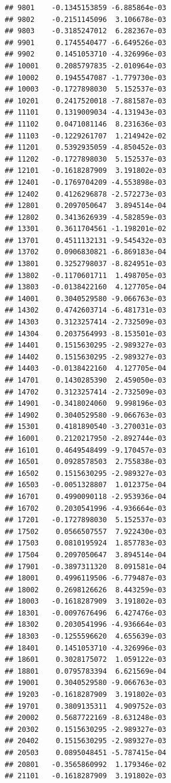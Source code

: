 \documentclass[ignorenonframetext,]{beamer}
\begin{document}
\begin{frame}[fragile]
\begin{verbatim}
## 9801    -0.1345153859 -6.885864e-03
## 9802    -0.2151145096  3.106678e-03
## 9803    -0.3185247012  6.282367e-03
## 9901     0.1745540477 -6.649526e-03
## 9902     0.1451053710 -4.326996e-03
## 10001    0.2085797835 -2.010964e-03
## 10002    0.1945547087 -1.779730e-03
## 10003   -0.1727898030  5.152537e-03
## 10201    0.2417520018 -7.881587e-03
## 11101    0.1319009034 -4.131943e-03
## 11102    0.0471081146  8.231636e-03
## 11103   -0.1229261707  1.214942e-02
## 11201    0.5392935059 -4.850452e-03
## 11202   -0.1727898030  5.152537e-03
## 12101   -0.1618287909  3.191802e-03
## 12401   -0.1769704209 -4.553898e-03
## 12402    0.4126296878 -2.572273e-03
## 12801    0.2097050647  3.894514e-04
## 12802    0.3413626939 -4.582859e-03
## 13301    0.3611704561 -1.198201e-02
## 13701    0.4511132131 -9.545432e-03
## 13702    0.0906830821 -6.869183e-04
## 13801    0.3252798037 -8.824951e-03
## 13802   -0.1170601711  1.498705e-03
## 13803   -0.0138422160  4.127705e-04
## 14001    0.3040529580 -9.066763e-03
## 14302    0.4742603714 -6.481731e-03
## 14303    0.3123257414 -2.732509e-03
## 14304    0.2037564993 -8.153501e-03
## 14401    0.1515630295 -2.989327e-03
## 14402    0.1515630295 -2.989327e-03
## 14403   -0.0138422160  4.127705e-04
## 14701    0.1430285390  2.459050e-03
## 14702    0.3123257414 -2.732509e-03
## 14901   -0.3418024060  9.998196e-03
## 14902    0.3040529580 -9.066763e-03
## 15301    0.4181890540 -3.270031e-03
## 16001    0.2120217950 -2.892744e-03
## 16101    0.4649548499 -9.170457e-03
## 16501    0.0928578503  2.755838e-03
## 16502    0.1515630295 -2.989327e-03
## 16503   -0.0051328807  1.012375e-04
## 16701    0.4990090118 -2.953936e-04
## 16702    0.2030541996 -4.936664e-03
## 17201   -0.1727898030  5.152537e-03
## 17502    0.0566507557  7.922430e-03
## 17503    0.0810195924  1.857783e-03
## 17504    0.2097050647  3.894514e-04
## 17901   -0.3897311320  8.091581e-04
## 18001    0.4996119506 -6.779487e-03
## 18002    0.2698126626  8.443259e-03
## 18003   -0.1618287909  3.191802e-03
## 18301   -0.0097676496  6.427476e-03
## 18302    0.2030541996 -4.936664e-03
## 18303   -0.1255596620  4.655639e-03
## 18401    0.1451053710 -4.326996e-03
## 18601    0.3028175072  1.059122e-03
## 18801    0.0795783394  6.621569e-04
## 19001    0.3040529580 -9.066763e-03
## 19203   -0.1618287909  3.191802e-03
## 19701    0.3809135311  4.909752e-03
## 20002    0.5687722169 -8.631248e-03
## 20302    0.1515630295 -2.989327e-03
## 20402    0.1515630295 -2.989327e-03
## 20503    0.0895048451 -5.787415e-04
## 20801   -0.3565860992  1.179346e-02
## 21101   -0.1618287909  3.191802e-03

\end{verbatim}
\end{frame}
\end{document}
